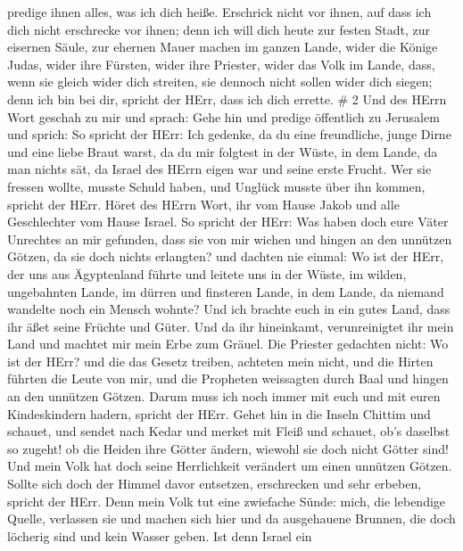 predige ihnen alles, was ich dich heiße. Erschrick nicht vor ihnen, auf
dass ich dich nicht erschrecke vor ihnen;  denn ich will
dich heute zur festen Stadt, zur eisernen Säule, zur ehernen Mauer
machen im ganzen Lande, wider die Könige Judas, wider ihre Fürsten,
wider ihre Priester, wider das Volk im Lande,  dass, wenn
sie gleich wider dich streiten, sie dennoch nicht sollen wider dich
siegen; denn ich bin bei dir, spricht der HErr, dass ich dich errette.
\# 2  Und des HErrn Wort geschah zu mir und sprach:
 Gehe hin und predige öffentlich zu Jerusalem und sprich: So
spricht der HErr: Ich gedenke, da du eine freundliche, junge Dirne und
eine liebe Braut warst, da du mir folgtest in der Wüste, in dem Lande,
da man nichts sät,  da Israel des HErrn eigen war und seine
erste Frucht. Wer sie fressen wollte, musste Schuld haben, und Unglück
musste über ihn kommen, spricht der HErr.  Höret des HErrn
Wort, ihr vom Hause Jakob und alle Geschlechter vom Hause Israel.
 So spricht der HErr: Was haben doch eure Väter Unrechtes an
mir gefunden, dass sie von mir wichen und hingen an den unnützen Götzen,
da sie doch nichts erlangten?  und dachten nie einmal: Wo
ist der HErr, der uns aus Ägyptenland führte und leitete uns in der
Wüste, im wilden, ungebahnten Lande, im dürren und finsteren Lande, in
dem Lande, da niemand wandelte noch ein Mensch wohnte?  Und
ich brachte euch in ein gutes Land, dass ihr äßet seine Früchte und
Güter. Und da ihr hineinkamt, verunreinigtet ihr mein Land und machtet
mir mein Erbe zum Gräuel.  Die Priester gedachten nicht: Wo
ist der HErr? und die das Gesetz treiben, achteten mein nicht, und die
Hirten führten die Leute von mir, und die Propheten weissagten durch
Baal und hingen an den unnützen Götzen.  Darum muss ich noch
immer mit euch und mit euren Kindeskindern hadern, spricht der HErr.
 Gehet hin in die Inseln Chittim und schauet, und sendet
nach Kedar und merket mit Fleiß und schauet, ob's daselbst so zugeht!
 ob die Heiden ihre Götter ändern, wiewohl sie doch nicht
Götter sind! Und mein Volk hat doch seine Herrlichkeit verändert um
einen unnützen Götzen.  Sollte sich doch der Himmel davor
entsetzen, erschrecken und sehr erbeben, spricht der HErr. 
Denn mein Volk tut eine zwiefache Sünde: mich, die lebendige Quelle,
verlassen sie und machen sich hier und da ausgehauene Brunnen, die doch
löcherig sind und kein Wasser geben.  Ist denn Israel ein

